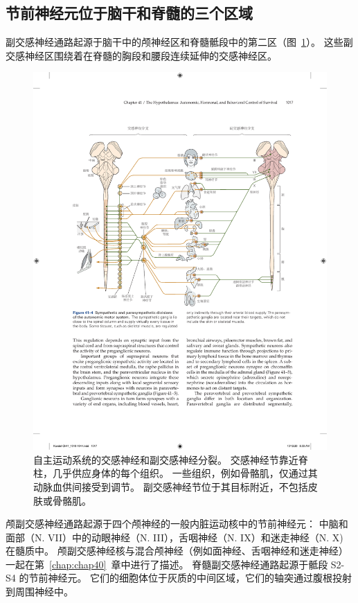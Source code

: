 \subsection{节前神经元位于脑干和脊髓的三个区域}

副交感神经通路起源于脑干中的颅神经区和脊髓骶段中的第二区（图~\ref{fig:41_4}）。
这些副交感神经区围绕着在脊髓的胸段和腰段连续延伸的交感神经区。


\begin{figure}[htbp]
	\centering
	\includegraphics[width=1.0\linewidth]{chap41/fig_41_4}
	\caption{自主运动系统的交感神经和副交感神经分裂。
		交感神经节靠近脊柱，几乎供应身体的每个组织。
		一些组织，例如骨骼肌，仅通过其动脉血供间接受到调节。
		副交感神经节位于其目标附近，不包括皮肤或骨骼肌。}
	\label{fig:41_4}
\end{figure}


颅副交感神经通路起源于四个颅神经的一般内脏运动核中的节前神经元：
中脑和面部（N. VII）中的动眼神经（N. III），舌咽神经（N. IX）和迷走神经（N. X) 在髓质中。 颅副交感神经核与混合颅神经（例如面神经、舌咽神经和迷走神经）一起在第~\ref{chap:chap40}~章中进行了描述。
脊髓副交感神经通路起源于骶段 S2-S4 的节前神经元。
它们的细胞体位于灰质的中间区域，它们的轴突通过腹根投射到周围神经中。


